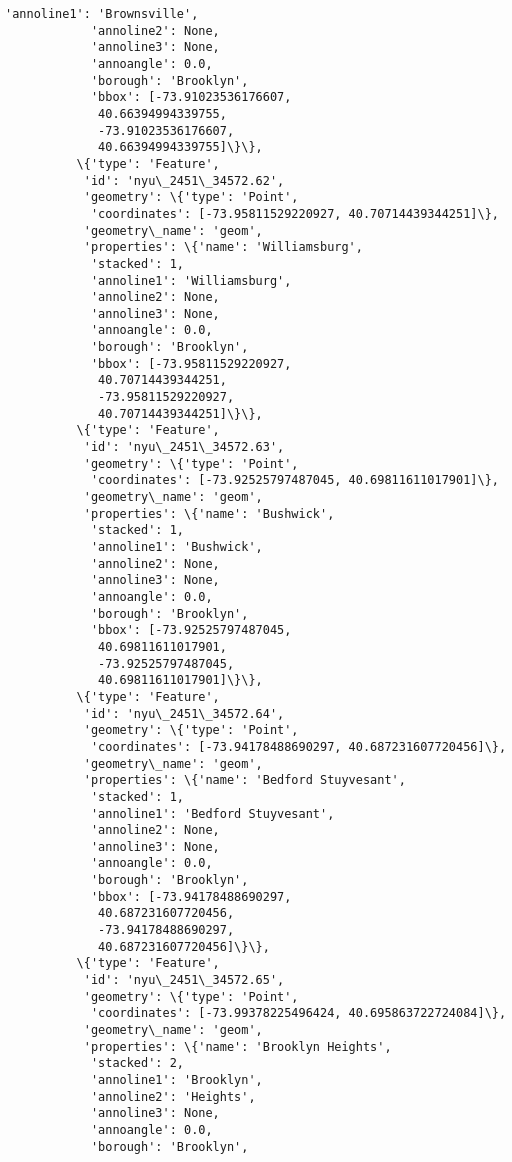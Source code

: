 \documentclass[11pt]{article}
\begin{document}
\begin{Verbatim}[commandchars=\\\{\}]
            'annoline1': 'Brownsville',
            'annoline2': None,
            'annoline3': None,
            'annoangle': 0.0,
            'borough': 'Brooklyn',
            'bbox': [-73.91023536176607,
             40.66394994339755,
             -73.91023536176607,
             40.66394994339755]\}\},
          \{'type': 'Feature',
           'id': 'nyu\_2451\_34572.62',
           'geometry': \{'type': 'Point',
            'coordinates': [-73.95811529220927, 40.70714439344251]\},
           'geometry\_name': 'geom',
           'properties': \{'name': 'Williamsburg',
            'stacked': 1,
            'annoline1': 'Williamsburg',
            'annoline2': None,
            'annoline3': None,
            'annoangle': 0.0,
            'borough': 'Brooklyn',
            'bbox': [-73.95811529220927,
             40.70714439344251,
             -73.95811529220927,
             40.70714439344251]\}\},
          \{'type': 'Feature',
           'id': 'nyu\_2451\_34572.63',
           'geometry': \{'type': 'Point',
            'coordinates': [-73.92525797487045, 40.69811611017901]\},
           'geometry\_name': 'geom',
           'properties': \{'name': 'Bushwick',
            'stacked': 1,
            'annoline1': 'Bushwick',
            'annoline2': None,
            'annoline3': None,
            'annoangle': 0.0,
            'borough': 'Brooklyn',
            'bbox': [-73.92525797487045,
             40.69811611017901,
             -73.92525797487045,
             40.69811611017901]\}\},
          \{'type': 'Feature',
           'id': 'nyu\_2451\_34572.64',
           'geometry': \{'type': 'Point',
            'coordinates': [-73.94178488690297, 40.687231607720456]\},
           'geometry\_name': 'geom',
           'properties': \{'name': 'Bedford Stuyvesant',
            'stacked': 1,
            'annoline1': 'Bedford Stuyvesant',
            'annoline2': None,
            'annoline3': None,
            'annoangle': 0.0,
            'borough': 'Brooklyn',
            'bbox': [-73.94178488690297,
             40.687231607720456,
             -73.94178488690297,
             40.687231607720456]\}\},
          \{'type': 'Feature',
           'id': 'nyu\_2451\_34572.65',
           'geometry': \{'type': 'Point',
            'coordinates': [-73.99378225496424, 40.695863722724084]\},
           'geometry\_name': 'geom',
           'properties': \{'name': 'Brooklyn Heights',
            'stacked': 2,
            'annoline1': 'Brooklyn',
            'annoline2': 'Heights',
            'annoline3': None,
            'annoangle': 0.0,
            'borough': 'Brooklyn',

\end{Verbatim}
\end{document}
